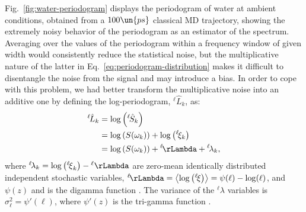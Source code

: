Fig.~\ref{fig:water-periodogram} displays the periodogram of water at ambient conditions, obtained from a $100\un{ps}$ classical MD trajectory, showing the extremely noisy behavior of the periodogram as an estimator of the spectrum. Averaging over the values of the periodogram within a frequency window of given width \citep{MovingAverage} would consistently reduce the statistical noise, but the multiplicative nature of the latter in Eq.~\eqref{eq:periodogram-distribution} makes it difficult to disentangle the noise from the signal and may introduce a bias. In order to cope with this problem, we had better transform the multiplicative noise into an additive one by defining the log-periodogram, $^{{\ell\!}}\hat{L}_{k}$, as:
\begin{equation}
  \begin{aligned}
    ^{{\ell\!}}\hat{L}_{k} &= \log \left (^{\ell\!}\hat{S}_{k} \right ) \\
    &= \log\left(S(\omega_k) \right) + \log\left( ^{\ell\!}{\xi}_k\right ) \\
    &= \log\left(S(\omega_k) \right) + {^{\ell\!}\rLambda} + {^{\ell\!}{\lambda}}_{k},
  \end{aligned} \label{eq:log-PSD}
\end{equation}
where $^{\ell\!}{\lambda}_k = \log\left( {^{\ell\!}{\xi}}_k\right) - {^\ell{\rLambda}}$
are zero-mean identically distributed independent stochastic variables, ${^{\ell\!}\rLambda} = \left\langle \log\left( {^{\ell\!}{\xi}}\right ) \right\rangle = \psi(\ell)-\log(\ell)$, and $\psi(z)$ and is the digamma function \citep{PolyGamma}. The variance of the $^{\ell\!}\lambda$ variables is $\sigma_{\ell}^{2} =\psi'(\ell)$, where $\psi'(z)$ is the tri-gamma function \citep{PolyGamma}.

